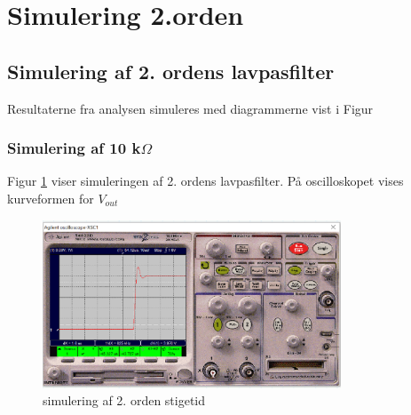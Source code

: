\section{Simulering 2.orden}

\subsection{Simulering af 2. ordens lavpasfilter}
Resultaterne fra analysen simuleres med diagrammerne vist i Figur 



\subsubsection{Simulering af 10 k$\Omega$ }
Figur \ref{2orden/stigetid} viser simuleringen af 2. ordens lavpasfilter. På oscilloskopet vises kurveformen for $V_{out}$ 

\begin{figure}[h]
 \begin{center}
  \includegraphics[height=5cm]{P_fig/figur8_1k_stigetid}
  \caption{simulering af 2. orden stigetid}
  \label{2orden/stigetid}
 \end{center}
\end{figure}